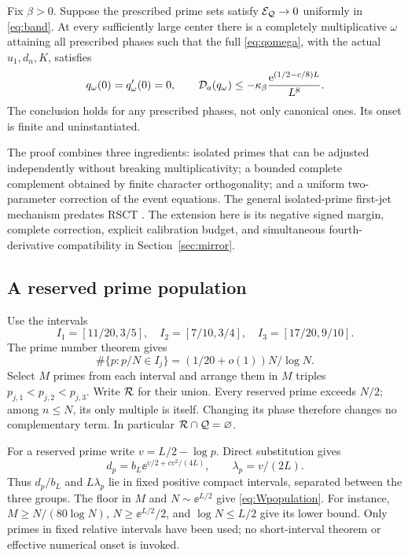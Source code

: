 \begin{theorem}
\label{thm:mult}
Fix \(\beta>0\). Suppose the prescribed prime sets satisfy
\(\mathcal E_{\mathcal Q}\to0\) uniformly in \eqref{eq:band}. At every
sufficiently large center there is a completely multiplicative
\(\omega\) attaining all prescribed phases such that the full
\eqref{eq:qomega}, with the actual \(u_1,d_n,K\), satisfies
\begin{equation}\label{eq:multnegative}
 q_\omega(0)=q_\omega'(0)=0,\qquad
 \mathcal D_a(q_\omega)\le
 -\kappa_\beta\frac{\mathrm e^{(1/2-c/8)L}}{L^8}.
\end{equation}
The conclusion holds for any prescribed phases, not only canonical
ones. Its onset is finite and uninstantiated.
\end{theorem}

The proof combines three ingredients: isolated primes that can be
adjusted independently without breaking multiplicativity; a bounded
complete complement obtained by finite character orthogonality; and
a uniform two-parameter correction of the event equations.
The general isolated-prime first-jet mechanism predates RSCT
\cite{collision}. The extension here is its negative signed margin,
complete correction, explicit calibration budget, and simultaneous
fourth-derivative compatibility in Section~\ref{sec:mirror}.

\subsection{A reserved prime population}

Use the intervals
\[
 I_1=[11/20,3/5],\quad I_2=[7/10,3/4],\quad
 I_3=[17/20,9/10].
\]
The prime number theorem \cite{dlmfpnt} gives
\[
 \#\{p:p/N\in I_j\}=(1/20+o(1))N/\log N.
\]
Select \(M\) primes from each interval and arrange them in \(M\)
triples \(p_{j,1}<p_{j,2}<p_{j,3}\). Write \(\mathcal R\) for their union.
Every reserved prime exceeds \(N/2\); among \(n\le N\), its only
multiple is itself. Changing its phase therefore changes no
complementary term. In particular \(\mathcal R\cap\mathcal Q=\varnothing\).

For a reserved prime write \(v=L/2-\log p\). Direct substitution gives
\begin{equation}\label{eq:primeweights}
 d_p=b_L\ee^{v/2+cv^2/(4L)},\qquad \lambda_p=v/(2L).
\end{equation}
Thus \(d_p/b_L\) and \(L\lambda_p\) lie in fixed positive compact
intervals, separated between the three groups. The floor in \(M\)
and \(N\sim\ee^{L/2}\) give \eqref{eq:Wpopulation}. For instance,
\(M\ge N/(80\log N)\), \(N\ge\ee^{L/2}/2\), and
\(\log N\le L/2\) give its lower bound.
Only primes in fixed relative intervals have been used; no
short-interval theorem or effective numerical onset is invoked.

